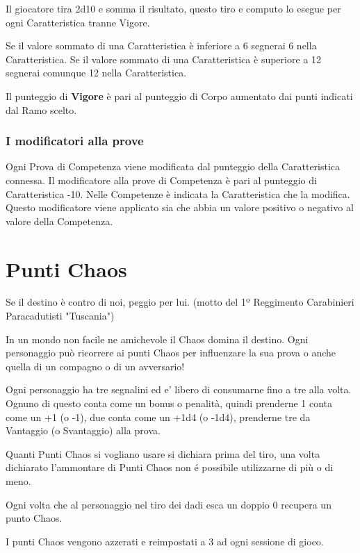 \documentclass[12pt,a4paper,twoside,openany]{book}
\begin{document}
\begin{multicols}{2}
Il giocatore tira 2d10 e somma il risultato, questo tiro e computo lo esegue per ogni Caratteristica tranne Vigore.

Se il valore sommato di una Caratteristica è inferiore a 6 segnerai 6 nella Caratteristica. Se il valore sommato di una Caratteristica è superiore a 12 segnerai comunque 12 nella Caratteristica.

Il punteggio di \textbf{Vigore} è pari al punteggio di Corpo aumentato dai punti indicati dal Ramo scelto.

\subsubsection{I modificatori alla prove}

Ogni Prova di Competenza viene modificata dal punteggio della Caratteristica connessa. 
Il modificatore alla prove di Competenza è pari al punteggio di Caratteristica -10. Nelle Competenze è indicata la Caratteristica che la modifica. Questo modificatore viene applicato sia che abbia un valore positivo o negativo al valore della Competenza.

\end{multicols}

\section{Punti Chaos}

\begin{multicols}{2}
	

\begin{changemargin}{0.3cm}{0.3cm}\begin{enfasi}{Se il destino è contro di noi, peggio per lui. (motto del 1º Reggimento Carabinieri Paracadutisti "Tuscania")}\end{enfasi}\end{changemargin}

In un mondo non facile ne amichevole il Chaos domina il destino. Ogni personaggio può ricorrere ai punti Chaos per influenzare la sua prova o anche quella di un compagno o di un avversario!

Ogni personaggio ha tre segnalini ed e' libero di consumarne fino a tre alla volta. Ognuno di questo conta come un bonus o penalità, quindi prenderne 1 conta come un +1 (o -1), due conta come un +1d4 (o -1d4), prenderne tre da Vantaggio (o Svantaggio) alla prova. 

Quanti Punti Chaos si vogliano usare si dichiara prima del tiro, una volta dichiarato l'ammontare di Punti Chaos non é possibile utilizzarne di più o di meno.

Ogni volta che al personaggio nel tiro dei dadi esca un doppio 0 recupera un punto Chaos.

I punti Chaos vengono azzerati e reimpostati a 3 ad ogni sessione di gioco.

\end{multicols}
\end{document}
